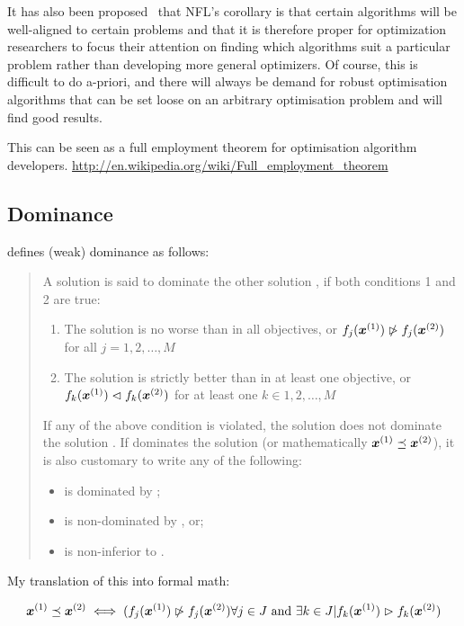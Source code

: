 It has also been proposed \citehere\ that NFL's corollary is that certain algorithms will be well-aligned to certain problems and that it is therefore proper for optimization researchers to focus their attention on finding which algorithms suit a particular problem rather than developing more general optimizers. Of course, this is difficult to do a-priori, and there will always be demand for robust optimisation algorithms that can be set loose on an arbitrary optimisation problem and will find good results.

This can be seen as a full employment theorem for optimisation algorithm developers. \url{http://en.wikipedia.org/wiki/Full_employment_theorem}

\subsection{Dominance}
\citet[28]{deb.kalyanmoy2001multi-objective} defines (weak) dominance as follows:

\begin{quote}
  A solution  is said to dominate the other solution , if both conditions 1 and 2 are true:
  \begin{enumerate}
  \item The solution  is no worse than  in all objectives, or $f_j(\boldsymbol{x}^{(1)}) \ntriangleright f_j(\boldsymbol{x}^{(2)})$ for all $j = 1,2,\ldots,M$
  \item The solution  is strictly better than  in at least one objective, or $f_k(\boldsymbol{x}^{(1)}) \vartriangleleft f_k(\boldsymbol{x}^{(2)})$ for at least one $k \in {1, 2,\ldots,M}$
\end{enumerate}

  If any of the above condition is violated, the solution  does not dominate the solution .
  If  dominates the solution  (or mathematically $\boldsymbol{x}^{(1)} \preceq \boldsymbol{x}^{(2)}$), it is also customary to write any of the following:
  \begin{itemize}
  \item {} is dominated by ;
  \item {} is non-dominated by , or;
  \item {} is non-inferior to .
  \end{itemize}
\end{quote}

My translation of this into formal math:

\begin{equation}
  \label{eq:3}
  \boldsymbol{x}^{(1)} \preceq \boldsymbol{x}^{(2)} \iff ( f_j(\boldsymbol{x}^{(1)}) \ntriangleright f_j(\boldsymbol{x}^{(2)}) \forall j \in J \textrm{~and~} \exists k \in J | f_k(\boldsymbol{x}^{(1)}) \vartriangleright f_k(\boldsymbol{x}^{(2)})
\end{equation}

